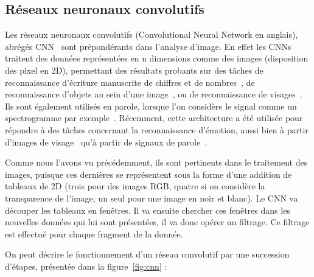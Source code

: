 \subsection{Réseaux neuronaux convolutifs}
Les réseaux neuronaux convolutifs (Convolutional Neural Network en anglais), abrégés CNN~\cite{LeCun1989} sont prépondérants dans l'analyse d'image. En effet les CNNs traitent des données représentées en n dimensions comme des images (disposition des pixel en 2D), permettant des résultats probants sur des tâches de reconnaissance d'écriture manuscrite de chiffres et de nombres~\cite{LeCun1998}, de reconnaissance d'objets au sein d'une image~\cite{Traore2018}, ou de reconnaissance de visages~\cite{Liu2016}. Ils sont également utilisés en parole, lorsque l'on considère le signal comme un spectrogramme par exemple~\cite{Abdel2014}. Récemment, cette architecture a été utilisée pour répondre à des tâches concernant la reconnaissance d'émotion, aussi bien à partir d'images de visage~\cite{Pitaloka2017,Mehendale2020} qu'à partir de signaux de parole~\cite{Zhang2016}.



Comme nous l'avons vu précédemment, ils sont pertinents dans le traitement des images, puisque ces dernières se représentent sous la forme d'une addition de tableaux de 2D (trois pour des images RGB, quatre si on considère la transparence de l'image, un seul pour une image en noir et blanc).
Le CNN va découper les tableaux en fenêtres. Il va ensuite chercher ces fenêtres dans les nouvelles données qui lui sont présentées, il va donc opérer un filtrage. Ce filtrage est effectué pour chaque fragment de la donnée.

On peut décrire le fonctionnement d'un réseau convolutif par une succession d'étapes, présentée dans la figure~\ref{fig:cnn} :

